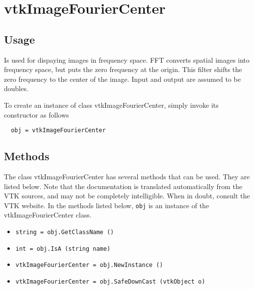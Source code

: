 \section{vtkImageFourierCenter}

\subsection{Usage}

 Is used for dispaying images in frequency space.  FFT converts spatial
 images into frequency space, but puts the zero frequency at the origin.
 This filter shifts the zero frequency to the center of the image.
 Input and output are assumed to be doubles.

To create an instance of class vtkImageFourierCenter, simply
invoke its constructor as follows
\begin{verbatim}
  obj = vtkImageFourierCenter
\end{verbatim}
\subsection{Methods}

The class vtkImageFourierCenter has several methods that can be used.
  They are listed below.
Note that the documentation is translated automatically from the VTK sources,
and may not be completely intelligible.  When in doubt, consult the VTK website.
In the methods listed below, \verb|obj| is an instance of the vtkImageFourierCenter class.
\begin{itemize}
\item  \verb|string = obj.GetClassName ()|

\item  \verb|int = obj.IsA (string name)|

\item  \verb|vtkImageFourierCenter = obj.NewInstance ()|

\item  \verb|vtkImageFourierCenter = obj.SafeDownCast (vtkObject o)|

\end{itemize}
